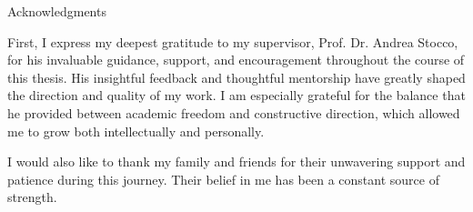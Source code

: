 \thispagestyle{empty}

\vspace*{20mm}

\begin{center}
    { Acknowledgments}
\end{center}

\vspace{10mm}

First, I express my deepest gratitude to my supervisor, Prof. Dr. Andrea Stocco, for his invaluable guidance, support, and encouragement throughout the course of this thesis. His insightful feedback and thoughtful mentorship have greatly shaped the direction and quality of my work. I am especially grateful for the balance that he provided between academic freedom and constructive direction, which allowed me to grow both intellectually and personally.

I would also like to thank my family and friends for their unwavering support and patience during this journey. Their belief in me has been a constant source of strength.


\cleardoublepage{}
